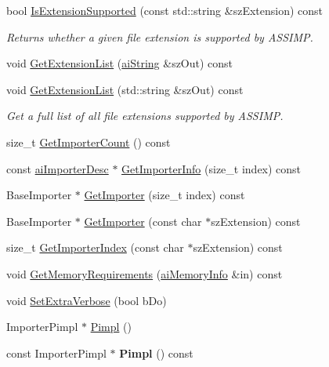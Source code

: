 \begin{DoxyCompactItemize}
\item 
bool \hyperlink{class_assimp_1_1_importer_a5b01905366f5bf8d1f89d51f755bf7d2}{Is\-Extension\-Supported} (const std\-::string \&sz\-Extension) const 
\begin{DoxyCompactList}\small\item\em Returns whether a given file extension is supported by A\-S\-S\-I\-M\-P. \end{DoxyCompactList}\item 
void \hyperlink{class_assimp_1_1_importer_a23c85647f7977012d9fef20b36c2d579}{Get\-Extension\-List} (\hyperlink{structai_string}{ai\-String} \&sz\-Out) const 
\item 
void \hyperlink{class_assimp_1_1_importer_a6ab684351c55e170de3c5b7d730b306d}{Get\-Extension\-List} (std\-::string \&sz\-Out) const 
\begin{DoxyCompactList}\small\item\em Get a full list of all file extensions supported by A\-S\-S\-I\-M\-P. \end{DoxyCompactList}\item 
size\-\_\-t \hyperlink{class_assimp_1_1_importer_afe982451f1a1c9b0b59c788f9329ccc1}{Get\-Importer\-Count} () const 
\item 
const \hyperlink{structai_importer_desc}{ai\-Importer\-Desc} $\ast$ \hyperlink{class_assimp_1_1_importer_a857dd22e071521c7747dc909f6a8f6f9}{Get\-Importer\-Info} (size\-\_\-t index) const 
\item 
Base\-Importer $\ast$ \hyperlink{class_assimp_1_1_importer_a712a0545a11c9d198392867552ba6646}{Get\-Importer} (size\-\_\-t index) const 
\item 
Base\-Importer $\ast$ \hyperlink{class_assimp_1_1_importer_a18921ab411273fa95961f60848ad6007}{Get\-Importer} (const char $\ast$sz\-Extension) const 
\item 
size\-\_\-t \hyperlink{class_assimp_1_1_importer_aee103460f66b9cbe3143400ec92ffc56}{Get\-Importer\-Index} (const char $\ast$sz\-Extension) const 
\item 
void \hyperlink{class_assimp_1_1_importer_aba2eacd0b627cb481b6d66d9ca55eac9}{Get\-Memory\-Requirements} (\hyperlink{structai_memory_info}{ai\-Memory\-Info} \&in) const 
\item 
void \hyperlink{class_assimp_1_1_importer_a9bb793072c84c784279d0f6e870bb42d}{Set\-Extra\-Verbose} (bool b\-Do)
\item 
Importer\-Pimpl $\ast$ \hyperlink{class_assimp_1_1_importer_ac112839f323a630f83395acb74746827}{Pimpl} ()
\item 
\hypertarget{class_assimp_1_1_importer_a6bf9560ac8b1353ae809ff1d99c9c661}{const Importer\-Pimpl $\ast$ {\bfseries Pimpl} () const }\label{class_assimp_1_1_importer_a6bf9560ac8b1353ae809ff1d99c9c661}

\end{DoxyCompactItemize}
